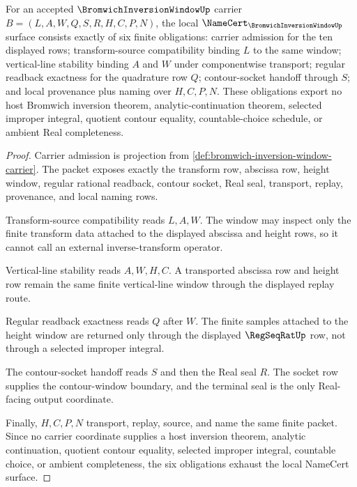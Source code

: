 \begin{theorem}
\label{thm:bromwich-inversion-window-namecert-obligations}
For an accepted $\BromwichInversionWindowUp$ carrier $B=(L,A,W,Q,S,R,H,C,P,N)$, the local $\NameCert_{\BromwichInversionWindowUp}$ surface consists exactly of six finite obligations: carrier admission for the ten displayed rows; transform-source compatibility binding $L$ to the same window; vertical-line stability binding $A$ and $W$ under componentwise transport; regular readback exactness for the quadrature row $Q$; contour-socket handoff through $S$; and local provenance plus naming over $H,C,P,N$. These obligations export no host Bromwich inversion theorem, analytic-continuation theorem, selected improper integral, quotient contour equality, countable-choice schedule, or ambient Real completeness.
\end{theorem}
\begin{proof}
Carrier admission is projection from \autoref{def:bromwich-inversion-window-carrier}. The packet exposes exactly the transform row, abscissa row, height window, regular rational readback, contour socket, Real seal, transport, replay, provenance, and local naming rows.

Transform-source compatibility reads $L,A,W$. The window may inspect only the finite transform data attached to the displayed abscissa and height rows, so it cannot call an external inverse-transform operator.

Vertical-line stability reads $A,W,H,C$. A transported abscissa row and height row remain the same finite vertical-line window through the displayed replay route.

Regular readback exactness reads $Q$ after $W$. The finite samples attached to the height window are returned only through the displayed $\RegSeqRatUp$ row, not through a selected improper integral.

The contour-socket handoff reads $S$ and then the Real seal $R$. The socket row supplies the contour-window boundary, and the terminal seal is the only Real-facing output coordinate.

Finally, $H,C,P,N$ transport, replay, source, and name the same finite packet. Since no carrier coordinate supplies a host inversion theorem, analytic continuation, quotient contour equality, selected improper integral, countable choice, or ambient completeness, the six obligations exhaust the local NameCert surface.
\end{proof}

